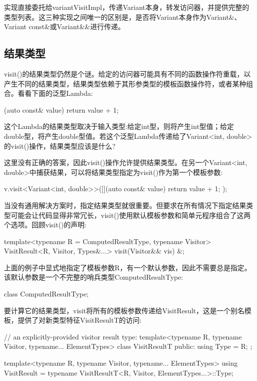 实现直接委托给variantVisitImpl，传递Variant本身，转发访问器，并提供完整的类型列表。这三种实现之间唯一的区别是，是否将Variant本身作为Variant\&、Variant const\&或Variant\&\&进行传递。

\subsection{结果类型}

visit()的结果类型仍然是个谜。给定的访问器可能具有不同的函数操作符重载，以产生不同的结果类型，结果类型依赖于其形参类型的模板函数操作符，或者某种组合。看看下面的泛型Lambda:

\begin{cpp}
[](auto const& value) {
	return value + 1;
}
\end{cpp}

这个Lambda的结果类型取决于输入类型:给定int型，则将产生int型值；给定double型，将产生double型值。若这个泛型Lambda传递给了Variant<int, double>的visit()操作，结果类型应该是什么?

这里没有正确的答案，因此visit()操作允许提供结果类型。在另一个Variant<int, double>中捕获结果，可以将结果类型指定为visit()作为第一个模板参数:

\begin{cpp}
v.visit<Variant<int, double>>([](auto const& value) {
								return value + 1;
							});
\end{cpp}

当没有通用解决方案时，指定结果类型就很重要。但要求在所有情况下指定结果类型可能会让代码显得非常冗长，visit()使用默认模板参数和简单元程序组合了这两个选项。回顾visit()的声明:

\begin{cpp}
template<typename R = ComputedResultType, typename Visitor>
VisitResult<R, Visitor, Types&...> visit(Visitor&& vis) &;
\end{cpp}

上面的例子中显式地指定了模板参数R，有一个默认参数，因此不需要总是指定。该默认参数是一个不完整的哨兵类型ComputedResultType:

\begin{cpp}
class ComputedResultType;
\end{cpp}

要计算它的结果类型，visit将所有的模板参数传递给VisitResult，这是一个别名模板，提供了对新类型特征VisitResultT的访问:

\begin{cpp}
// an explicitly-provided visitor result type:
template<typename R, typename Visitor, typename... ElementTypes>
class VisitResultT
{
	public:
	using Type = R;
};

template<typename R, typename Visitor, typename... ElementTypes>
using VisitResult =
typename VisitResultT<R, Visitor, ElementTypes...>::Type;
\end{cpp}

